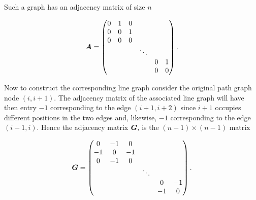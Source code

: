 \begin{figure}[H]
  \centering
  
\end{figure}

Such a graph has an adjacency matrix of size $n$

\begin{equation}
  \bm{A} =
  \begin{pmatrix}
    {0} & {1} & {0} & {}       & {}  & {}  \\
    {0} & {0} & {1} & {}       & {}  & {}  \\
    {0} & {0} & {0} & {}       & {}  & {}  \\
    {}  & {}  & {}  & {\ddots} & {}  & {}  \\
    {}  & {}  & {}  & {}       & {0} & {1} \\
    {}  & {}  & {}  & {}       & {0} & {0}
  \end{pmatrix}.
\end{equation}

Now to construct the corresponding line graph consider the original path graph node $(i, i+1)$. The adjacency matrix of the associated line graph will have then entry $-1$ corresponding to the edge $(i+1, i+2)$ since $i+1$ occupies different positions in the two edges and, likewise, $-1$ corresponding to the edge $(i-1, i)$. Hence the adjacency matrix $\bm{G},$ is the $(n-1) \times (n-1)$ matrix

\begin{equation}
  \bm{G} =
  \begin{pmatrix}
    {0}  & {-1} & {0}  & {}       & {}   & {}   \\
    {-1} & {0}  & {-1} & {}       & {}   & {}   \\
    {0}  & {-1} & {0}  & {}       & {}   & {}   \\
    {}   & {}   & {}   & {\ddots} & {}   & {}   \\
    {}   & {}   & {}   & {}       & {0}  & {-1} \\
    {}   & {}   & {}   & {}       & {-1} & {0}
  \end{pmatrix}.
\end{equation}

\begin{figure}[H]
  \centering
  
\end{figure}